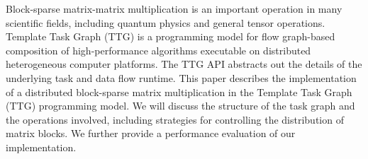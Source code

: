 Block-sparse matrix-matrix multiplication is an important operation in many scientific fields, including quantum physics and general tensor operations. Template Task Graph (TTG) is a programming model for flow graph-based composition of high-performance algorithms executable on distributed heterogeneous computer platforms. The TTG API abstracts out the details of the underlying task and data flow runtime. This paper describes the implementation of a distributed block-sparse matrix multiplication in the Template Task Graph (TTG) programming model. We will discuss the structure of the task graph and the operations involved, including strategies for controlling the distribution of matrix blocks. We further provide a performance evaluation of our implementation.
